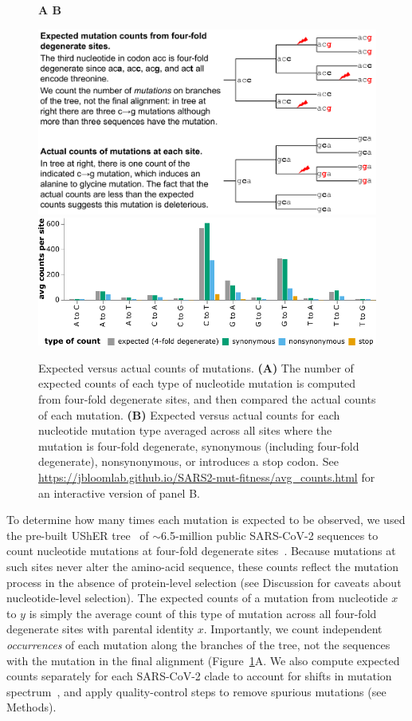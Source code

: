 \documentclass[9pt,twocolumn,twoside]{gsajnl_modified}
\begin{document}
\begin{figure}
{\bf \Large A \hspace{0.47\linewidth} B}

\includegraphics[width=0.48\linewidth,valign=t]{figs/schematic/schematic.pdf}
\hspace{0.02\linewidth}
\includegraphics[width=0.5\linewidth,valign=t]{figs/avg_counts.pdf}
\caption{
Expected versus actual counts of mutations.
{\bf (A)}
The number of expected counts of each type of nucleotide mutation is computed from four-fold degenerate sites, and then compared the actual counts of each mutation.
{\bf (B)}
Expected versus actual counts for each nucleotide mutation type averaged across all sites where the mutation is four-fold degenerate, synonymous (including four-fold degenerate), nonsynonymous, or introduces a stop codon.
See \url{https://jbloomlab.github.io/SARS2-mut-fitness/avg_counts.html} for an interactive version of panel B.
\label{fig:expected_vs_actual}
}
\end{figure}

To determine how many times each mutation is expected to be observed, we used the pre-built UShER tree~\citep{turakhia2021ultrafast,lanfear2020} of $\sim$6.5-million public SARS-CoV-2 sequences to count nucleotide mutations at four-fold degenerate sites~\citep[Figure~\ref{fig:expected_vs_actual};][]{bloom2022evolution}.
Because mutations at such sites never alter the amino-acid sequence, these counts reflect the mutation process in the absence of protein-level selection (see Discussion for caveats about nucleotide-level selection).
The expected counts of a mutation from nucleotide $x$ to $y$ is simply the average count of this type of mutation across all four-fold degenerate sites with parental identity $x$.
Importantly, we count independent \emph{occurrences} of each mutation along the branches of the tree, not the sequences with the mutation in the final alignment (Figure~\ref{fig:expected_vs_actual}A.
We also compute expected counts separately for each SARS-CoV-2 clade to account for shifts in mutation spectrum~\cite{bloom2022evolution,ruis2022mutational}, and apply quality-control steps to remove spurious mutations (see Methods).
\end{document}
